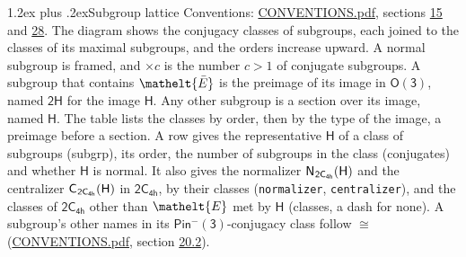 \documentclass[10pt,a4paper]{article}
\makeatletter
\renewcommand\section{\@startsection{section}{1}{\z@}{-3ex plus -1ex minus -.2ex}%
  {1.2ex plus .2ex}{\normalfont\large\sffamily\bfseries\color{parttitle}}}
\numberwithin{equation}{section}
\newcommand{\eltfont}[1]{{\let\sigma\eltsigma\mathelt{#1}}}
\newcommand{\grp}[1]{\mathsf{#1}}
\newcommand{\cls}[1]{\eltfont{#1}}
\newcommand{\elt}[1]{\eltfont{#1}}
\newcommand{\samecls}{\cong}
\newcommand{\barred}[1]{\bar{#1}}
\newcommand{\hairsp}{\mkern1mu}
\makeatother
\begin{document}
\section{Subgroup lattice}\label{s:subgroups}
Conventions: \href{../../CONVENTIONS.pdf}{CONVENTIONS.pdf}, sections \href{../../../rotation/CONVENTIONS.pdf\#conv.15}{15} and \href{../../CONVENTIONS.pdf\#conv.28}{28}.
The diagram shows the conjugacy classes of subgroups, each joined to the classes of its maximal subgroups, and the orders increase upward. \label{n:index.conjugates.c}A normal subgroup is framed, and ${\times}c$ is the number $c > 1$ of conjugate subgroups. \label{n:group.H}A subgroup that contains $\elt{\barred{E}}$ is the preimage of its image in $\grp{O(3)}$, named $\grp{2H}$ for the image $\grp{H}$. Any other subgroup is a section over its image, named $\grp{H}$. The table lists the classes by order, then by the type of the image, a preimage before a section. \label{n:head.subgroup}\label{n:head.order}\label{n:head.conjugates}\label{n:head.normal}A row gives the representative $\grp{H}$ of a class of subgroups (subgrp), its order, the number of subgroups in the class (conjugates) and whether $\grp{H}$ is normal. \label{n:group.normalizer}\label{n:group.centralizer}\label{n:head.classes}It also gives the normalizer $\grp{N}_{\hairsp \grp{2C_{4h}}}(\grp{H})$ and the centralizer $\grp{C}_{\hairsp \grp{2C_{4h}}}(\grp{H})$ in $\grp{2C_{4h}}$, by their classes (\texttt{normalizer}, \texttt{centralizer}), and the classes of $\grp{2C_{4h}}$ other than $\cls{E}$ met by $\grp{H}$ (classes, a dash for none). A subgroup's other names in its \href{Pinminus3.pdf}{$\grp{Pin^{-}(3)}$}-conjugacy class follow $\samecls$ (\href{../../CONVENTIONS.pdf}{CONVENTIONS.pdf}, section \href{../../CONVENTIONS.pdf\#conv.20.2}{20.2}).
\end{document}
